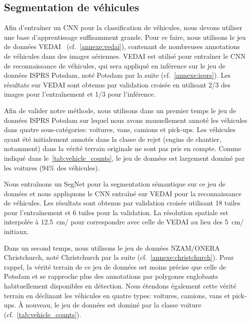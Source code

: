 \subsection{Segmentation de véhicules}

Afin d'entraîner un \gls{CNN} pour la classification de véhicules, nous devons utiliser une base d'apprentissage suffisamment grande. Pour ce faire, nous utilisons le jeu de données \gls{VEDAI}~\cite{razakarivony_vehicle_2016} (cf.~\cref{annexe:vedai}), contenant de nombreuses annotations de véhicules dans des images aériennes. \gls{VEDAI} est utilisé pour entraîner le \gls{CNN} de reconnaissance de véhicules, qui sera appliqué en inférence sur le jeu de données \gls{ISPRS} Potsdam, noté Potsdam par la suite (cf.~\cref{annexe:isprs}). Les résultats sur \gls{VEDAI} sont obtenus par validation croisée en utilisant 2/3 des images pour l'entraînement et 1/3 pour l'inférence.

Afin de valider notre méthode, nous utilisons dans un premier temps le jeu de données \gls{ISPRS} Potsdam sur lequel nous avons manuellement annoté les véhicules dans quatre sous-catégories: voitures, vans, camions et pick-ups. Les véhicules ayant été initialement annotés dans la classe de rejet (engins de chantier, notamment) dans la vérité terrain originale ne sont pas pris en compte. Comme indiqué dans le~\cref{tab:vehicle_counts}, le jeu de données est largement dominé par les voitures (94\% des véhicules).

Nous entraînons un SegNet pour la segmentation sémantique sur ce jeu de données et nous appliquons le \gls{CNN} entraîné sur \gls{VEDAI} pour la reconnaissance de véhicules. Les résultats sont obtenus par validation croisée utilisant 18 tuiles pour l'entraînement et 6 tuiles pour la validation. La résolution spatiale est interpolée à \SI{12,5}{\centi\meter/\px} pour correspondre avec celle de \gls{VEDAI} au lieu des \SI{5}{\centi\meter/\px} initiaux.

Dans un second temps, nous utilisons le jeu de données NZAM/ONERA Christchurch, noté Christchurch par la suite (cf.~\cref{annexe:christchurch}). Pour rappel, la vérité terrain de ce jeu de données est moins précise que celle de Potsdam et se rapproche plus des annotations par polygones englobants habituellement disponibles en détection. Nous étendons également cette vérité terrain en déclinant les véhicules en quatre types: voitures, camions, vans et pick-ups. À nouveau, le jeu de données est dominé par la classe voiture (cf.~\cref{tab:vehicle_counts}).

